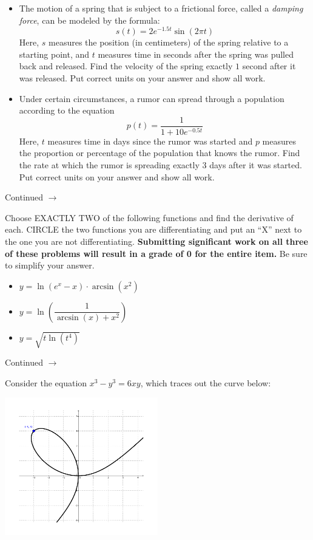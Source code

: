 \documentclass[addpoints]{exam}
\def\pageturn{\vfill
\begin{flushright}
	\begin{small}
		Continued $\rightarrow$
	\end{small}
\end{flushright}
\newpage}
\begin{document}
\begin{questions}
\begin{itemize}
	\item The motion of a spring that is subject to a frictional force, called a \emph{damping force}, can be modeled by the formula: 
	\[ s(t) = 2e^{-1.5t} \sin(2\pi t)\] 
Here, $s$ measures the position (in centimeters) of the spring relative to a starting point, and $t$ measures time in seconds after the spring was pulled back and released. Find the velocity of the spring exactly $1$ second after it was released. Put correct units on your answer and show all work. 

	\item Under certain circumstances, a rumor can spread through a population according to the equation
	\[ p(t) = \frac{1}{1 + 10e^{-0.5t}} \]
Here, $t$ measures time in days since the rumor was started and $p$ measures the proportion or percentage of the population that knows the rumor. Find the rate at which the rumor is spreading exactly 3 days after it was started.	Put correct units on your answer and show all work. 

\end{itemize}


\pageturn

\question[16] Choose EXACTLY TWO of the following functions and find the derivative of each. CIRCLE the two functions you are differentiating and put an ``X'' next to the one you are not differentiating. \textbf{Submitting significant work on all three of these problems will result in a grade of 0 for the entire item. } Be sure to simplify your answer.  

\begin{itemize}
	 \item $y = \ln(e^x - x) \cdot \arcsin(x^2)$ 
	 \item $y = \ln\left( \dfrac{1}{\arcsin(x) + x^2}\right)$ 
	\item $y = \sqrt{t \ln(t^4)}$  
\end{itemize}

\pageturn

\question Consider the equation $x^3 - y^3 = 6xy$, which traces out the curve below: 
\begin{center}
	\includegraphics[width=0.5\textwidth]{a2-implicitplot2}
\end{center}


\end{questions}
\end{document}
